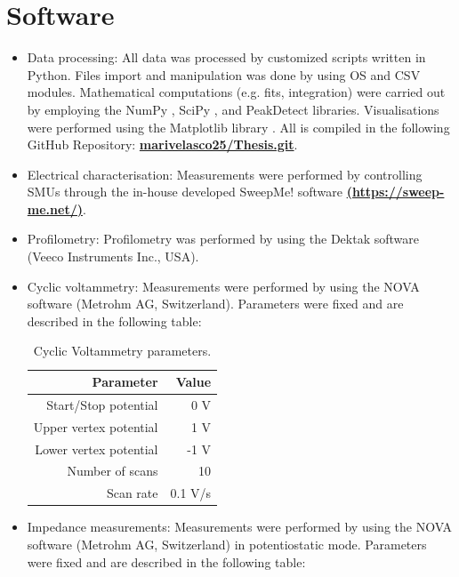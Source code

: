 \section{Software} \label{param}
\begin{itemize}
\item Data processing: All data was processed by customized scripts written in Python. Files import and manipulation was done by using OS \cite{os_module} and CSV \cite{csv_module} modules. Mathematical computations (e.g. fits, integration) were carried out by employing the NumPy \cite{numpy_2012}, SciPy \cite{scipy_linreg}, and PeakDetect \cite{peakdetect} libraries. Visualisations were performed using the Matplotlib library \cite{matplotlib_2012}. All is compiled in the following GitHub Repository: \href{https://github.com/marivelascoe25/Thesis.git}{\textbf{marivelasco25/Thesis.git}}.
\item Electrical characterisation: Measurements were performed by controlling SMUs through the in-house developed SweepMe! software \href{https://sweep-me.net/}{\textbf{(https://sweep-me.net/)}}. 
\item Profilometry: Profilometry was performed by using the Dektak software (Veeco Instruments Inc., USA).
\item Cyclic voltammetry: Measurements were performed by using the NOVA software (Metrohm AG, Switzerland). Parameters were fixed and are described in the following table: 

\begin{table}[h]
	\centering
	\caption{Cyclic Voltammetry parameters.}
	\begin{tabular}{r r} \hline
		Parameter	& Value \\ \hline
		Start/Stop potential	& 0 V \\ 
		Upper vertex potential	& 1 V \\ 
		Lower vertex potential	& -1 V \\ 
		Number of scans	& 10 \\ 
		Scan rate	& 0.1 V/s \\ \hline
	\end{tabular}
	\label{tab:CV}
\end{table}

\item Impedance measurements: Measurements were performed by using the NOVA software (Metrohm AG, Switzerland) in potentiostatic mode. Parameters were fixed and are described in the following table: 


\end{itemize}
